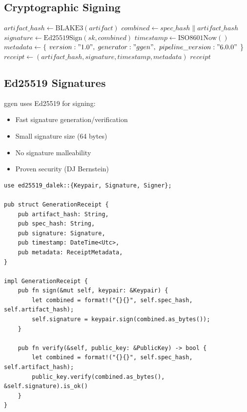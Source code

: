 \subsection{Cryptographic Signing}

\begin{algorithm}
\caption{Receipt Generation}
\begin{algorithmic}[1]
    \State $artifact\_hash \gets \text{BLAKE3}(artifact)$
    \State $combined \gets spec\_hash \| artifact\_hash$
    \State $signature \gets \text{Ed25519Sign}(sk, combined)$
    \State $timestamp \gets \text{ISO8601Now}()$
    \State $metadata \gets \{$
    \State \quad $version: "1.0",$
    \State \quad $generator: "ggen",$
    \State \quad $pipeline\_version: "6.0.0"$
    \State \}
    \State $receipt \gets (artifact\_hash, signature, timestamp, metadata)$
    \State \Return $receipt$
\EndProcedure
\end{algorithmic}
\end{algorithm}

\subsection{Ed25519 Signatures}

ggen uses Ed25519 for signing:
\begin{itemize}
    \item Fast signature generation/verification
    \item Small signature size (64 bytes)
    \item No signature malleability
    \item Proven security (DJ Bernstein)
\end{itemize}

\begin{verbatim}
use ed25519_dalek::{Keypair, Signature, Signer};

pub struct GenerationReceipt {
    pub artifact_hash: String,
    pub spec_hash: String,
    pub signature: Signature,
    pub timestamp: DateTime<Utc>,
    pub metadata: ReceiptMetadata,
}

impl GenerationReceipt {
    pub fn sign(&mut self, keypair: &Keypair) {
        let combined = format!("{}{}", self.spec_hash, self.artifact_hash);
        self.signature = keypair.sign(combined.as_bytes());
    }

    pub fn verify(&self, public_key: &PublicKey) -> bool {
        let combined = format!("{}{}", self.spec_hash, self.artifact_hash);
        public_key.verify(combined.as_bytes(), &self.signature).is_ok()
    }
}
\end{verbatim}

